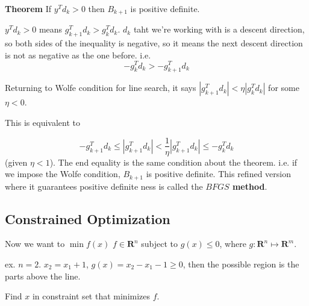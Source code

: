 \textbf{Theorem} If $y^Td_k > 0$ then $B_{k+1}$ is positive definite.

 $y^Td_k>0$ means $g_{k+1}^Td_k > g_k^Td_k$. $d_k$ taht we're working
 with is a descent direction, so both sides of the inequality is
 negative, so it means the next descent direction is not as negative as
 the one before. i.e. $$-g_k^Td_k > -g_{k+1}^Td_k$$

Returning to Wolfe condition for line search, it says $|g_{k+1}^Td_k |<
\eta |g_k^Td_k|$ for some $\eta < 0$.

This is equivalent to

$$-g_{k+1}^Td_k \le |g_{k+1}^Td_k| < \frac{1}{\eta}|g_{k+1}^Td_k| \le
-g_k^Td_k$$
(given $\eta < 1$). The end equality is the same condition about the theorem. i.e. if we
impose the Wolfe condition, $B_{k+1}$ is positive definite.
This refined version where it guarantees positive definite ness is
called the \textbf{$BFGS$ method}.

\subsection{Constrained Optimization}
\label{sec:constrainedoptimization}

Now we want to $ \min f(x)$ $f\in \mathbf{R}^n$ subject to $g(x)
\le 0$, where $g: \mathbf{R}^n \mapsto \mathbf{R}^m$.

ex. $n=2$. $x_2 = x_1+1$, $g(x) = x_2 - x_1 - 1 \ge 0$, then the
possible region is the parts above the line. 

Find $x$ in constraint set that minimizes $f$.

